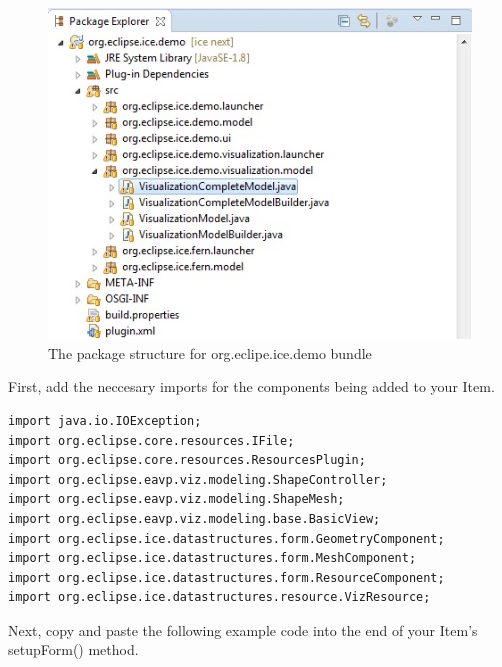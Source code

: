 \begin{figure}[!H]
\includegraphics[width=\textwidth]{images/DemoPackageStructure}
\centering
\caption{The package structure for org.eclipe.ice.demo bundle}
\label{fig:demostructure}
\end{figure}

First, add the neccesary imports for the components being added to your Item. 

\begin{verbatim}
import java.io.IOException;
import org.eclipse.core.resources.IFile;
import org.eclipse.core.resources.ResourcesPlugin;
import org.eclipse.eavp.viz.modeling.ShapeController;
import org.eclipse.eavp.viz.modeling.ShapeMesh;
import org.eclipse.eavp.viz.modeling.base.BasicView;
import org.eclipse.ice.datastructures.form.GeometryComponent;
import org.eclipse.ice.datastructures.form.MeshComponent;
import org.eclipse.ice.datastructures.form.ResourceComponent;
import org.eclipse.ice.datastructures.resource.VizResource;
\end{verbatim}

Next, copy and paste the following example code into the end of your Item's
setupForm() method.

